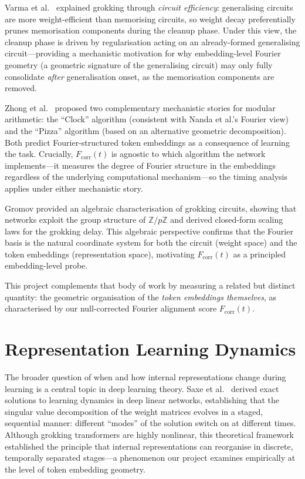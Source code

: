 \documentclass[12pt,openany,a4paper]{book}
\newcommand{\fcorr}{F_{\mathrm{corr}}}
\begin{document}
Varma et al.\ \cite{varma2023explaining} explained grokking through
\emph{circuit efficiency}: generalising circuits are more weight-efficient
than memorising circuits, so weight decay preferentially prunes
memorisation components during the cleanup phase.
Under this view, the cleanup phase is driven by regularisation acting
on an already-formed generalising circuit---providing a mechanistic
motivation for why embedding-level Fourier geometry (a geometric
signature of the generalising circuit) may only fully consolidate
\emph{after} generalisation onset, as the memorisation components
are removed.

Zhong et al.\ \cite{zhong2023clock} proposed two complementary
mechanistic stories for modular arithmetic: the ``Clock'' algorithm
(consistent with Nanda et al.'s Fourier view) and the ``Pizza''
algorithm (based on an alternative geometric decomposition).
Both predict Fourier-structured token embeddings as a consequence of
learning the task.
Crucially, $\fcorr(t)$ is agnostic to which algorithm the network
implements---it measures the degree of Fourier structure in the
embeddings regardless of the underlying computational mechanism---so
the timing analysis applies under either mechanistic story.

Gromov \cite{gromov2023grokking} provided an algebraic characterisation
of grokking circuits, showing that networks exploit the group structure
of $\mathbb{Z}/p\mathbb{Z}$ and derived closed-form scaling laws for
the grokking delay.
This algebraic perspective confirms that the Fourier basis is the
natural coordinate system for both the circuit (weight space) and
the token embeddings (representation space), motivating $\fcorr(t)$
as a principled embedding-level probe.

This project complements that body of work by measuring a
related but distinct quantity: the geometric organisation of the
\emph{token embeddings themselves}, as characterised by our
null-corrected Fourier alignment score $\fcorr(t)$.

\section{Representation Learning Dynamics}

The broader question of when and how internal representations change
during learning is a central topic in deep learning theory.
Saxe et al.\ \cite{saxe2014exact} derived exact solutions to learning
dynamics in deep linear networks, establishing that the singular
value decomposition of the weight matrices evolves in a staged,
sequential manner: different ``modes'' of the solution switch on at
different times.
Although grokking transformers are highly nonlinear, this theoretical
framework established the principle that internal representations
can reorganise in discrete, temporally separated stages---a
phenomenon our project examines empirically at the level of token
embedding geometry.
\end{document}
